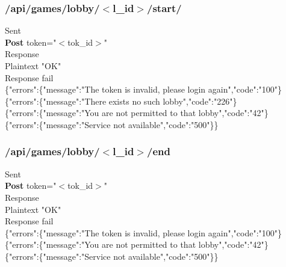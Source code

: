\subsubsection{/api/games/lobby/$<$l\_id$>$/start/}
\tab	Sent\\
\tab\tab	\textbf{Post} token="$<$tok\_id$>$"\\
\tab	Response\\
\tab\tab	Plaintext "OK"\\
\tab	Response fail\\
\tab\tab	\{"errors":\{"message":"The token is invalid, please login again","code":"100"\}\\
\tab\tab	\{"errors":\{"message":"There exists no such lobby","code":"226"\}\\
\tab\tab	\{"errors":\{"message":"You are not permitted to that lobby","code":"42"\}\\
\tab\tab	\{"errors":\{"message":"Service not available","code":"500"\}\}   \\ 

\subsubsection{/api/games/lobby/$<$l\_id$>$/end}
\tab	Sent\\
\tab\tab	\textbf{Post} token="$<$tok\_id$>$"\\
\tab	Response\\
\tab\tab	Plaintext "OK"\\
\tab	Response fail\\
\tab\tab	\{"errors":\{"message":"The token is invalid, please login again","code":"100"\}\\
\tab\tab	\{"errors":\{"message":"You are not permitted to that lobby","code":"42"\}\\
\tab\tab	\{"errors":\{"message":"Service not available","code":"500"\}\}\\
